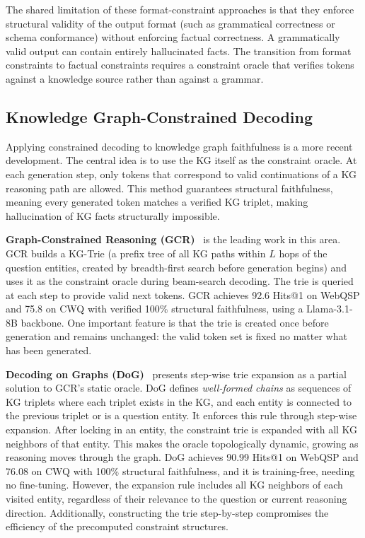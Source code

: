 The shared limitation of these format-constraint approaches is that they enforce structural validity of the output format (such as grammatical correctness or schema conformance) without enforcing factual correctness. A grammatically valid output can contain entirely hallucinated facts. The transition from format constraints to factual constraints requires a constraint oracle that verifies tokens against a knowledge source rather than against a grammar.

\subsection{Knowledge Graph-Constrained Decoding}

Applying constrained decoding to knowledge graph faithfulness is a more recent development. The central idea is to use the KG itself as the constraint oracle. At each generation step, only tokens that correspond to valid continuations of a KG reasoning path are allowed. This method guarantees structural faithfulness, meaning every generated token matches a verified KG triplet, making hallucination of KG facts structurally impossible.

\textbf{Graph-Constrained Reasoning (GCR)}~\citep{luo2025-graph-constrained-reasoning} is the leading work in this area. GCR builds a KG-Trie (a prefix tree of all KG paths within $L$ hops of the question entities, created by breadth-first search before generation begins) and uses it as the constraint oracle during beam-search decoding. The trie is queried at each step to provide valid next tokens. GCR achieves 92.6 Hits@1 on WebQSP and 75.8 on CWQ with verified 100\% structural faithfulness, using a Llama-3.1-8B backbone. One important feature is that the trie is created once before generation and remains unchanged: the valid token set is fixed no matter what has been generated.

\textbf{Decoding on Graphs (DoG)}~\citep{li2024-decoding-on-graphs} presents step-wise trie expansion as a partial solution to GCR's static oracle. DoG defines \textit{well-formed chains} as sequences of KG triplets where each triplet exists in the KG, and each entity is connected to the previous triplet or is a question entity. It enforces this rule through step-wise expansion. After locking in an entity, the constraint trie is expanded with all KG neighbors of that entity. This makes the oracle topologically dynamic, growing as reasoning moves through the graph. DoG achieves 90.99 Hits@1 on WebQSP and 76.08 on CWQ with 100\% structural faithfulness, and it is training-free, needing no fine-tuning. However, the expansion rule includes all KG neighbors of each visited entity, regardless of their relevance to the question or current reasoning direction. Additionally, constructing the trie step-by-step compromises the efficiency of the precomputed constraint structures.

